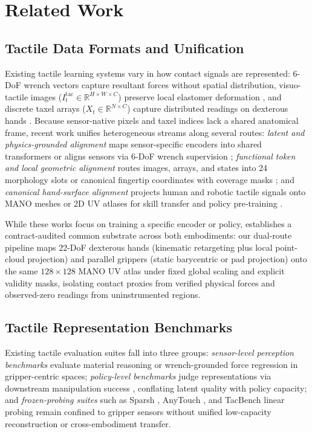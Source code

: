 \section{Related Work}
\label{sec:related}

\subsection{Tactile Data Formats and Unification}
\label{sec:related_unification}
Existing tactile learning systems vary in how contact signals are represented: 6-DoF wrench vectors capture resultant forces without spatial distribution, visuo-tactile images ($I_t^{\text{tac}} \in \mathbb{R}^{H\times W\times C}$) preserve local elastomer deformation \citep{higuera2024sparsh,feng2025anytouch}, and discrete taxel arrays ($X_t \in \mathbb{R}^{N\times C}$) capture distributed readings on dexterous hands \citep{han2026lingbottouch,yuan2026ftp1}.
Because sensor-native pixels and taxel indices lack a shared anatomical frame, recent work unifies heterogeneous streams along several routes:
\emph{latent and physics-grounded alignment} maps sensor-specific encoders into shared transformers \citep{zhao2024transferable,feng2025anytouch} or aligns sensors via 6-DoF wrench supervision \citep{jiang2026taffoundation};
\emph{functional token and local geometric alignment} routes images, arrays, and states into 24 morphology slots \citep{yuan2026ftp1} or canonical fingertip coordinates with coverage masks \citep{han2026lingbottouch};
and \emph{canonical hand-surface alignment} projects human and robotic tactile signals onto MANO meshes or 2D UV atlases \citep{romero2017embodied} for skill transfer and policy pre-training \citep{zhang2025unitachand,zhang2026ttp}.

While these works focus on training a specific encoder or policy, \bench{} establishes a contract-audited common substrate across both embodiments: our dual-route pipeline maps 22-DoF dexterous hands (kinematic retargeting plus local point-cloud projection) and parallel grippers (static barycentric or pad projection) onto the same $128\times 128$ MANO UV atlas under fixed global scaling and explicit validity masks, isolating contact proxies from verified physical forces and observed-zero readings from uninstrumented regions.

\subsection{Tactile Representation Benchmarks}
\label{sec:related_benchmarks}
Existing tactile evaluation suites fall into three groups:
\emph{sensor-level perception benchmarks} evaluate material reasoning \citep{yu2024octopi,lyu2026touchthinker} or wrench-grounded force regression \citep{jiang2026taffoundation} in gripper-centric spaces;
\emph{policy-level benchmarks} judge representations via downstream manipulation success \citep{yuan2026ftp1,zhang2026ttp}, conflating latent quality with policy capacity;
and \emph{frozen-probing suites} such as Sparsh \citep{higuera2024sparsh}, AnyTouch \citep{feng2025anytouch}, and TacBench linear probing \citep{wang2026potential} remain confined to gripper sensors without unified low-capacity reconstruction or cross-embodiment transfer.

